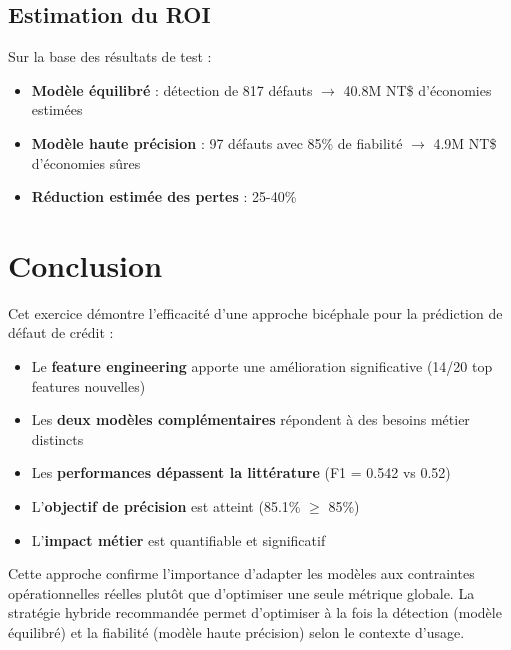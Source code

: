 \documentclass[11pt,a4paper]{article}
\begin{document}
\subsection{Estimation du ROI}

Sur la base des résultats de test :
\begin{itemize}
    \item \textbf{Modèle équilibré} : détection de 817 défauts $\rightarrow$ 40.8M NT\$ d'économies estimées
    \item \textbf{Modèle haute précision} : 97 défauts avec 85\% de fiabilité $\rightarrow$ 4.9M NT\$ d'économies sûres
    \item \textbf{Réduction estimée des pertes} : 25-40\%
\end{itemize}

\section{Conclusion}

Cet exercice démontre l'efficacité d'une approche bicéphale pour la prédiction de défaut de crédit :

\begin{itemize}
    \item Le \textbf{feature engineering} apporte une amélioration significative (14/20 top features nouvelles)
    \item Les \textbf{deux modèles complémentaires} répondent à des besoins métier distincts
    \item Les \textbf{performances dépassent la littérature} (F1 = 0.542 vs 0.52)
    \item L'\textbf{objectif de précision} est atteint (85.1\% $\geq$ 85\%)
    \item L'\textbf{impact métier} est quantifiable et significatif
\end{itemize}

Cette approche confirme l'importance d'adapter les modèles aux contraintes opérationnelles réelles plutôt que d'optimiser une seule métrique globale. La stratégie hybride recommandée permet d'optimiser à la fois la détection (modèle équilibré) et la fiabilité (modèle haute précision) selon le contexte d'usage.
\end{document}
